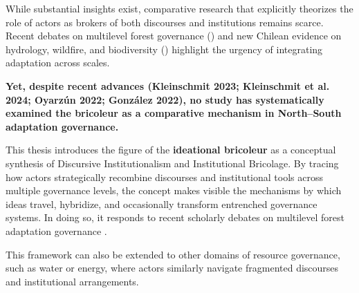 While substantial insights exist, comparative research that explicitly theorizes 
the role of actors as brokers of both discourses and institutions remains scarce. 
Recent debates on multilevel forest governance (\cite{KleinschmitChiassonPulzl2023,Kleinschmit2024}) 
and new Chilean evidence on hydrology, wildfire, and biodiversity 
(\cite{Oyarzun2022Bosque,Gonzalez2022Bosque,Bosque2022Biodiversity,RCHN2023Restoration}) 
highlight the urgency of integrating adaptation across scales. 

\textbf{Yet, despite recent advances (Kleinschmit 2023; Kleinschmit et al. 2024; Oyarzún 2022; González 2022), 
no study has systematically examined the bricoleur as a comparative mechanism in North–South adaptation governance.}



This thesis introduces the figure of the \textbf{ideational bricoleur} as a 
conceptual synthesis of Discursive Institutionalism and Institutional Bricolage. 
By tracing how actors strategically recombine discourses and institutional tools 
across multiple governance levels, the concept makes visible the mechanisms by 
which ideas travel, hybridize, and occasionally transform entrenched governance 
systems. In doing so, it responds to recent scholarly debates on multilevel forest 
adaptation governance \cite{KleinschmitChiassonPulzl2023,Kleinschmit2024}.

This framework can also be extended to other domains of resource governance, 
such as water or energy, where actors similarly navigate fragmented discourses 
and institutional arrangements.



